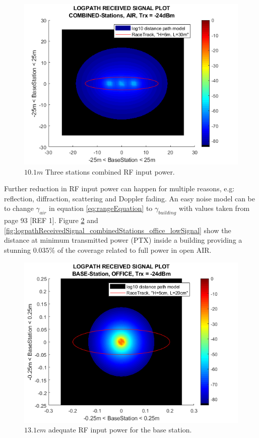 \begin{figure}[h]
	\centering
	\includegraphics[width=1\linewidth]{theory/pathLoss/fig/logpathReceivedSignal_combinedStations_air_lowSignal.png}
	\caption{$10.1m$ Three stations combined RF input power.}
	\label{fig:logpathReceivedSignal_combinedStations_air_lowSignal}
\end{figure}

\noindent Further reduction in RF input power can happen for multiple reasons, e.g: reflection, diffraction, scattering and Doppler fading. An easy noise model can be to change $\gamma_{air}$ in equation \ref{eq:rangeEquation} to $\gamma_{building}$ with values taken from page 93 [REF 1]. Figure \ref{fig:logpathReceivedSignal_baseStation_office_lowSignal} and \ref{fig:logpathReceivedSignal_combinedStations_office_lowSignal} show the distance at minimum transmitted power (PTX) inside a building providing a stunning $0.035\%$ of the coverage related to full power in open AIR.

\begin{figure}[h]
	\centering
	\includegraphics[width=1\linewidth]{theory/pathLoss/fig/logpathReceivedSignal_baseStation_office_lowSignal.png}
	\caption{$13.1cm$ adequate RF input power for the base station.}
	\label{fig:logpathReceivedSignal_baseStation_office_lowSignal}
\end{figure}

